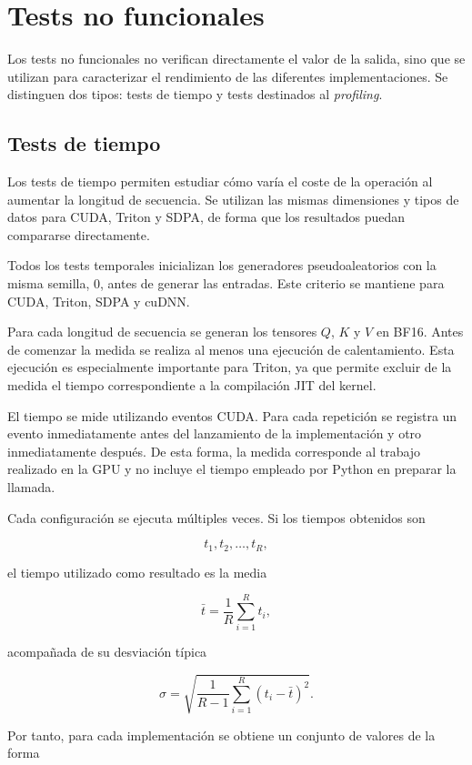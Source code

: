 \section{Tests no funcionales}

Los tests no funcionales no verifican directamente el valor de la salida, sino que se utilizan para caracterizar el rendimiento de las diferentes implementaciones. Se distinguen dos tipos: tests de tiempo y tests destinados al \textit{profiling}.

\subsection{Tests de tiempo}

Los tests de tiempo permiten estudiar cómo varía el coste de la operación al aumentar la longitud de secuencia. Se utilizan las mismas dimensiones y tipos de datos para CUDA, Triton y SDPA, de forma que los resultados puedan compararse directamente.

Todos los tests temporales inicializan los generadores pseudoaleatorios con la misma semilla, 0, antes de generar las entradas. Este criterio se mantiene para CUDA, Triton, SDPA y cuDNN.

Para cada longitud de secuencia se generan los tensores \(Q\), \(K\) y \(V\) en BF16. Antes de comenzar la medida se realiza al menos una ejecución de calentamiento. Esta ejecución es especialmente importante para Triton, ya que permite excluir de la medida el tiempo correspondiente a la compilación JIT del kernel.

El tiempo se mide utilizando eventos CUDA. Para cada repetición se registra un evento inmediatamente antes del lanzamiento de la implementación y otro inmediatamente después. De esta forma, la medida corresponde al trabajo realizado en la GPU y no incluye el tiempo empleado por Python en preparar la llamada.

Cada configuración se ejecuta múltiples veces. Si los tiempos obtenidos son

$$
t_1,t_2,\ldots,t_R,
$$

el tiempo utilizado como resultado es la media

$$
\bar{t}
=
\frac{1}{R}
\sum_{i=1}^{R}t_i,
$$

acompañada de su desviación típica

$$
\sigma =
\sqrt{
\frac{1}{R-1}
\sum_{i=1}^{R}
(t_i-\bar{t})^2
}.
$$

Por tanto, para cada implementación se obtiene un conjunto de valores de la forma

